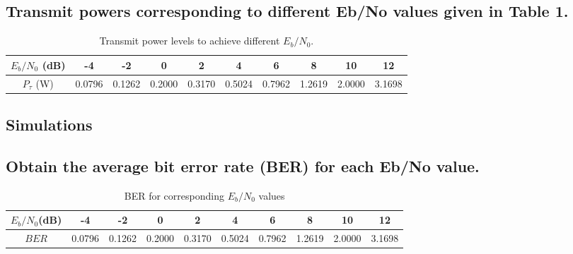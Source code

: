 \documentclass[11pt]{article}
\newcommand{\snr}{$E_{b}/N_{0}$}
\begin{document}



\subsection{Transmit powers corresponding to different Eb/No values given in Table 1.}

\begin{table}[h]
\centering
\caption{\label{tab:transmit_power_levels}Transmit power levels to achieve different $E_{b}/N_{0}$.}
\begin{tabular}{|c|c|c|c|c|c|c|c|c|c|}

\hline
$E_{b}/N_{0}$ (dB) & -4 & -2 & 0 & 2 & 4 & 6 & 8 & 10 & 12 \\\hline
$P_{\tau}$ (W) & 0.0796 & 0.1262 & 0.2000 & 0.3170 & 0.5024 &	0.7962 &	1.2619	& 2.0000 & 3.1698 \\\hline             %

\end{tabular}

\end{table}

\subsection{Simulations}
\subsection{Obtain the average bit error rate (BER) for each Eb/No value.}



\begin{table}[h]
\centering
\caption{BER for corresponding $E_{b}/N_{0}$ values}
\begin{tabular}{|c|c|c|c|c|c|c|c|c|c|}

\hline
\snr (dB) & -4     &     -2 &      0 &      2 &      4 &         6 &          8 &     10 &     12 \\\hline
$BER$     & 0.0796 & 0.1262 & 0.2000 & 0.3170 & 0.5024 &	0.7962 &	1.2619	& 2.0000 & 3.1698 \\\hline

\end{tabular}

\end{table}
\end{document}
